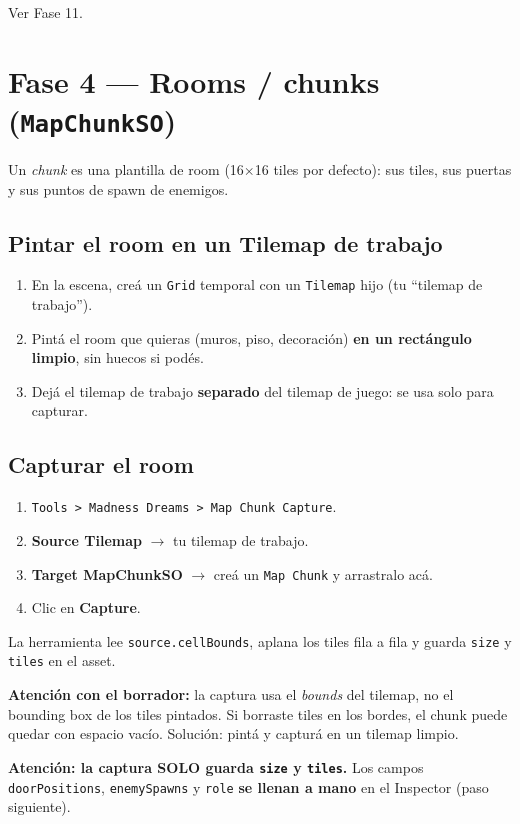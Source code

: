 \documentclass[a4paper,12pt]{article}
\newcommand{\code}[1]{\texttt{#1}}
\begin{document}
Ver Fase 11.

\section{Fase 4 --- Rooms / chunks (\code{MapChunkSO})}

Un \emph{chunk} es una plantilla de room (16$\times$16 tiles por defecto): sus tiles, sus
puertas y sus puntos de spawn de enemigos.

\subsection{Pintar el room en un Tilemap de trabajo}

\begin{enumerate}
    \item En la escena, creá un \code{Grid} temporal con un \code{Tilemap} hijo (tu ``tilemap de
    trabajo'').
    \item Pintá el room que quieras (muros, piso, decoración) \textbf{en un rectángulo limpio},
    sin huecos si podés.
    \item Dejá el tilemap de trabajo \textbf{separado} del tilemap de juego: se usa solo para
    capturar.
\end{enumerate}

\subsection{Capturar el room}

\begin{enumerate}
    \item \code{Tools > Madness Dreams > Map Chunk Capture}.
    \item \textbf{Source Tilemap} $\to$ tu tilemap de trabajo.
    \item \textbf{Target MapChunkSO} $\to$ creá un \code{Map Chunk} y arrastralo acá.
    \item Clic en \textbf{Capture}.
\end{enumerate}

La herramienta lee \code{source.cellBounds}, aplana los tiles fila a fila y guarda \code{size} y
\code{tiles} en el asset.

\textbf{Atención con el borrador:} la captura usa el \emph{bounds} del tilemap, no el bounding box
de los tiles pintados. Si borraste tiles en los bordes, el chunk puede quedar con espacio vacío.
Solución: pintá y capturá en un tilemap limpio.

\textbf{Atención: la captura SOLO guarda \code{size} y \code{tiles}.} Los campos
\code{doorPositions}, \code{enemySpawns} y \code{role} \textbf{se llenan a mano} en el Inspector
(paso siguiente).
\end{document}
